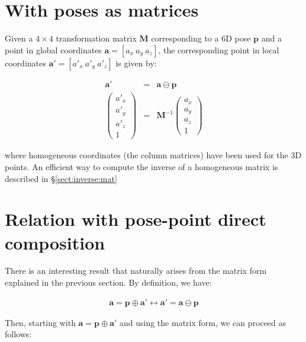 \documentclass[a4paper,10pt]{report}
\begin{document}
\section{With poses as matrices}

Given a $4\times 4$ transformation matrix $\mathbf{M}$ corresponding to a 6D pose 
$\mathbf{p}$ and a point in global coordinates 
$\mathbf{a} = [a_x ~ a_y ~ a_z]$, the corresponding point in local coordinates
$\mathbf{a'} = [a'_x ~ a'_y ~ a'_z]$ is given by:

\begin{eqnarray}
\mathbf{a'} &=& \mathbf{a} \ominus \mathbf{p} \nonumber \\
\left(\begin{array}{c}
 a'_x \\ a'_y \\ a'_z \\ 1
\end{array}\right)
&=&
\mathbf{M}^{-1} 
\left(\begin{array}{c}
 a_x \\ a_y \\ a_z \\ 1
\end{array}\right)
\end{eqnarray}

\noindent where homogeneous coordinates (the column matrices) have been used for the 3D points.
An efficient way to compute the inverse of a homogeneous matrix is 
described in \S \ref{sect:inverse:mat}


\section{Relation with pose-point direct composition}

There is an interesting result that naturally arises from the matrix form 
explained in the previous section.
By definition, we have:

\begin{eqnarray}
 \mathbf{a} = \mathbf{p} \oplus \mathbf{a'}   
\leftrightarrow
 \mathbf{a'} = \mathbf{a} \ominus \mathbf{p}
\label{eq:comp_invcomp}
\end{eqnarray}

Then, starting with $\mathbf{a} = \mathbf{p} \oplus \mathbf{a'}$
and using the matrix form, we can proceed as follows:
\end{document}
